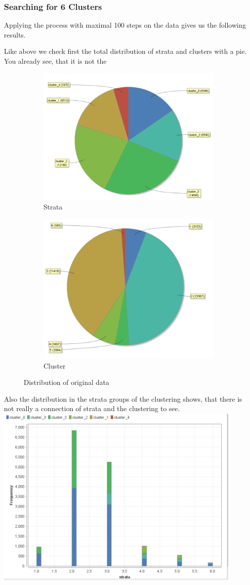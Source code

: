 \subsubsection{Searching for 6 Clusters}
Applying the process with maximal 100 steps on the data gives us the following results.

Like above we check first the total distribution of strata and clusters with a pie. You already see, that it is not the 
\begin{figure}[h]
\centering
\begin{subfigure}{.5\textwidth}
  \centering
  \includegraphics[width=.4\linewidth]{vectorclusteringcluster.PNG}
  \caption{Strata}
  \label{fig:OrgSt}
\end{subfigure}%
\begin{subfigure}{.5\textwidth}
  \centering
  \includegraphics[width=.4\linewidth]{vectorclusteringstrata.PNG}
  \caption{Cluster}
  \label{fig:OrgCl}
\end{subfigure}
\caption{Distribution of original data}
\label{fig:OrgDist}
\end{figure}

Also the distribution in the strata groups of the clustering shows, that there is not really a connection of strata and the clustering to see.
\includegraphics[width=0.9\textwidth]{vectorClustering.PNG}

